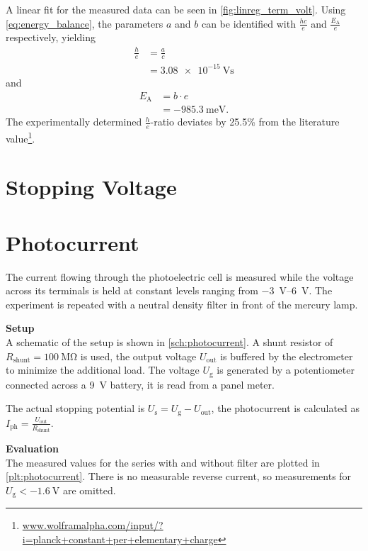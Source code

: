 A linear fit for the measured data can be seen in \autoref{fig:linreg_term_volt}.
Using \autoref{eq:energy_balance}, the parameters $a$ and $b$ can be identified with $\frac{hc}{e}$ and $\frac{E_\text{A}}{e}$ respectively, yielding
\begin{align*}
	\frac{h}{e} &= \frac{a}{c} \\
	&=\SI{3.08e-15}{\volt\second}
\end{align*}
and
\begin{align*}
	E_\text{A} &= b\cdot e \\
	&=\SI{-985.3}{\milli\eV}.
\end{align*}
The experimentally determined $\frac{h}{e}$-ratio deviates by \num{25.5}\% from the literature value\footnote{\url{www.wolframalpha.com/input/?i=planck+constant+per+elementary+charge}}.

\section{Stopping Voltage}%


\section{Photocurrent}%

The current flowing through the photoelectric cell is measured while the voltage across its terminals is held at constant levels ranging from \SIrange{-3}{6}{\volt}.
The experiment is repeated with a neutral density filter in front of the mercury lamp.

\textbf{Setup}\\
A schematic of the setup is shown in \autoref{sch:photocurrent}.
A shunt resistor of $R_\text{shunt} = \SI{100}{\mega\ohm}$ is used, the output voltage $U_\text{out}$ is buffered by the electrometer to minimize the additional load.
The voltage $U_\text{g}$ is generated by a potentiometer connected across a \SI{9}{\volt} battery, it is read from a panel meter.

The actual stopping potential is $U_\text{s} = U_\text{g} - U_\text{out}$, the photocurrent is calculated as $I_\text{ph} = \frac{U_\text{out}}{R_\text{shunt}}$.

\textbf{Evaluation}\\
The measured values for the series with and without filter are plotted in \autoref{plt:photocurrent}.
There is no measurable reverse current, so measurements for $U_\text{g} < \SI{-1.6}{\volt}$ are omitted.

